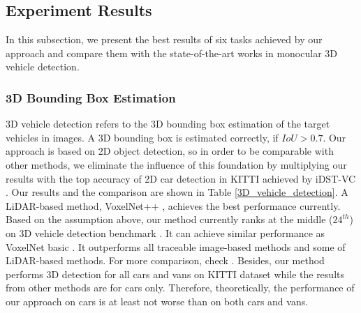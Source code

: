 \subsection{Experiment Results}
\label{exp_res}
In this subsection, we present the best results of six tasks achieved by our approach and compare them with the state-of-the-art works in monocular 3D vehicle detection.

\subsubsection{3D Bounding Box Estimation} 
3D vehicle detection refers to the 3D bounding box estimation of the target vehicles in images. A 3D bounding box is estimated correctly, if $IoU>0.7$. Our approach is based on 2D object detection, so in order to be comparable with other methods, we eliminate the influence of this foundation by multiplying our results with the top accuracy of 2D car detection in KITTI achieved by iDST-VC \cite{2dobject}. Our results and the comparison are shown in Table \ref{3D_vehicle_detection}. A LiDAR-based method, VoxelNet++ \cite{DBLP:journals/corr/abs-1711-06396}, achieves the best performance currently. Based on the assumption above, our method currently ranks at the middle ($24^{th}$) on 3D vehicle detection benchmark \cite{3dobject}. It can achieve similar performance as VoxelNet basic \cite{DBLP:journals/corr/abs-1711-06396}. It outperforms all traceable image-based methods and some of LiDAR-based methods. For more comparison, check \cite{3dobject}. Besides, our method performs 3D detection for all cars and vans on KITTI dataset while the results from other methods are for cars only. Therefore, theoretically, the performance of our approach on cars is at least not worse than on both cars and vans. 


